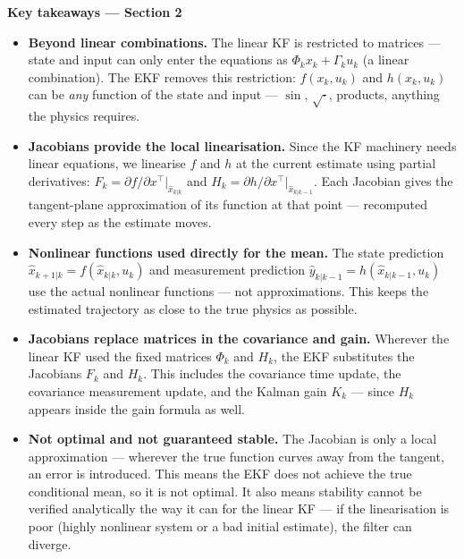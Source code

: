 \documentclass[12pt, a4paper]{article}
\begin{document}
\begin{keybox}
  \textbf{Key takeaways --- Section 2}
  \begin{itemize}[leftmargin=1.4em, topsep=2pt]
    \item \textbf{Beyond linear combinations.}
          The linear KF is restricted to matrices --- state and input
          can only enter the equations as $\Phi_k x_k + \Gamma_k u_k$
          (a linear combination).
          The EKF removes this restriction: $f(x_k, u_k)$ and
          $h(x_k, u_k)$ can be \emph{any} function of the state and
          input --- $\sin$, $\sqrt{\cdot}$, products, anything the
          physics requires.
    \item \textbf{Jacobians provide the local linearisation.}
          Since the KF machinery needs linear equations, we linearise
          $f$ and $h$ at the current estimate using partial derivatives:
          $F_k = \partial f/\partial x^\top|_{\hat{x}_{k|k}}$ and
          $H_k = \partial h/\partial x^\top|_{\hat{x}_{k|k-1}}$.
          Each Jacobian gives the tangent-plane approximation of its
          function at that point --- recomputed every step as the
          estimate moves.
    \item \textbf{Nonlinear functions used directly for the mean.}
          The state prediction $\hat{x}_{k+1|k} = f(\hat{x}_{k|k}, u_k)$
          and measurement prediction
          $\hat{y}_{k|k-1} = h(\hat{x}_{k|k-1}, u_k)$ use the actual
          nonlinear functions --- not approximations.
          This keeps the estimated trajectory as close to the true
          physics as possible.
    \item \textbf{Jacobians replace matrices in the covariance and gain.}
          Wherever the linear KF used the fixed matrices $\Phi_k$ and
          $H_k$, the EKF substitutes the Jacobians $F_k$ and $H_k$.
          This includes the covariance time update, the covariance
          measurement update, and the Kalman gain $K_k$ --- since
          $H_k$ appears inside the gain formula as well.
    \item \textbf{Not optimal and not guaranteed stable.}
          The Jacobian is only a local approximation --- wherever the
          true function curves away from the tangent, an error is
          introduced.
          This means the EKF does not achieve the true conditional
          mean, so it is not optimal.
          It also means stability cannot be verified analytically the
          way it can for the linear KF --- if the linearisation is
          poor (highly nonlinear system or a bad initial estimate),
          the filter can diverge.
  \end{itemize}
\end{keybox}
\end{document}

